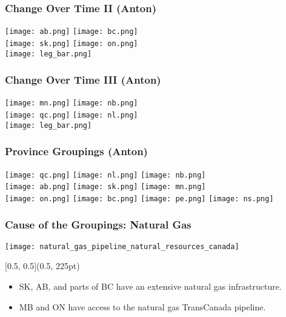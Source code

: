 \documentclass{beamer}
\begin{document}
\begin{frame}
\frametitle{Change Over Time II (Anton)}
\vspace{-10pt}
\begin{center}
\texttt{[image: ab.png]}%
\texttt{[image: bc.png]}\\
\texttt{[image: sk.png]}%
\texttt{[image: on.png]}\\
\texttt{[image: leg\_bar.png]}
\end{center}
\end{frame}


\begin{frame}
\frametitle{Change Over Time III (Anton)}
\vspace{-10pt}
\begin{center}
\texttt{[image: mn.png]}%
\texttt{[image: nb.png]}\\
\texttt{[image: qc.png]}%
\texttt{[image: nl.png]}\\
\texttt{[image: leg\_bar.png]}
\end{center}
\end{frame}



\begin{frame}
\frametitle{Province Groupings (Anton)}


\texttt{[image: qc.png]}%
\texttt{[image: nl.png]}%
\texttt{[image: nb.png]}\\[10pt]
%
\texttt{[image: ab.png]}%
\texttt{[image: sk.png]}%
\texttt{[image: mn.png]}\\[10pt]
%
\texttt{[image: on.png]}%
\texttt{[image: bc.png]}%
\texttt{[image: pe.png]}%
\texttt{[image: ns.png]}


\end{frame}





\begin{frame}
\frametitle{Cause of the Groupings: Natural Gas}
\vspace{-40pt}
\begin{center}
\texttt{[image: natural\_gas\_pipeline\_natural\_resources\_canada]}
\end{center} 

\begin{textblock*}{\textwidth}[0.5, 0.5](0.5\linewidth, 225pt)
\begin{itemize}
	\item SK, AB, and parts of BC have an extensive natural gas infrastructure.
	\item MB and ON have access to the natural gas TransCanada pipeline.
\end{itemize}
\end{textblock*}
\end{frame}
\end{document}
